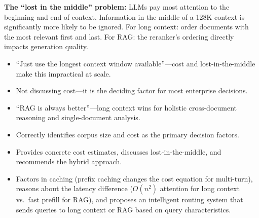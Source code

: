 \begin{interviewq}
\textbf{The ``lost in the middle'' problem:} LLMs pay most attention to the beginning and end of context. Information in the middle of a 128K context is significantly more likely to be ignored. For long context: order documents with the most relevant first and last. For RAG: the reranker's ordering directly impacts generation quality.

\redflags
\begin{itemize}
    \item ``Just use the longest context window available''---cost and lost-in-the-middle make this impractical at scale.
    \item Not discussing cost---it is the deciding factor for most enterprise decisions.
    \item ``RAG is always better''---long context wins for holistic cross-document reasoning and single-document analysis.
\end{itemize}


\goodgreat
\begin{itemize}
    \item {} Correctly identifies corpus size and cost as the primary decision factors.
    \item {} Provides concrete cost estimates, discusses lost-in-the-middle, and recommends the hybrid approach.
    \item {} Factors in caching (prefix caching changes the cost equation for multi-turn), reasons about the latency difference ($O(n^2)$ attention for long context vs.\ fast prefill for RAG), and proposes an intelligent routing system that sends queries to long context or RAG based on query characteristics.
\end{itemize}

\end{interviewq}



